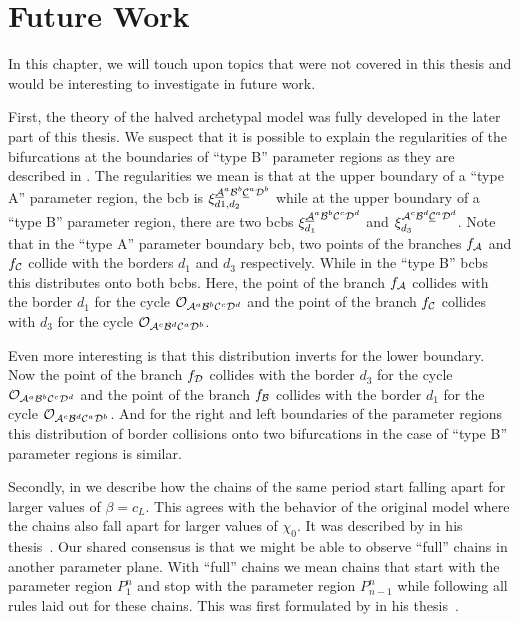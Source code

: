 \chapter{Future Work}
\label{chap:outlook}

In this chapter, we will touch upon topics that were not covered in this thesis and would be interesting to investigate in future work.

First, the theory of the halved archetypal model was fully developed in the later part of this thesis.
We suspect that it is possible to explain the regularities of the bifurcations at the boundaries of ``type B'' parameter regions as they are described in .
The regularities we mean is that at the upper boundary of a ``type A'' parameter region, the \gls{bcb} is $\xi_{d1, d_2}^{\underline{\mathcal{A}}^a\mathcal{B}^b\underline{\mathcal{C}}^a\mathcal{D}^b}$ while at the upper boundary of a ``type B'' parameter region, there are two \glspl{bcb} $\xi_{d_1}^{\underline{\mathcal{A}}^a\mathcal{B}^b\mathcal{C}^c\mathcal{D}^d}$ and $\xi_{d_3}^{\mathcal{A}^c\mathcal{B}^d\underline{\mathcal{C}}^a\mathcal{D}^d}$.
Note that in the ``type A'' parameter boundary \gls{bcb}, two points of the branches $f_{\mathcal{A}}$ and $f_{\mathcal{C}}$ collide with the borders $d_1$ and $d_3$ respectively.
While in the ``type B'' \glspl{bcb} this distributes onto both \glspl{bcb}.
Here, the point of the branch $f_{\mathcal{A}}$ collides with the border $d_1$ for the cycle $\mathcal{O}_{\mathcal{A}^a\mathcal{B}^b\mathcal{C}^c\mathcal{D}^d}$ and the point of the branch $f_{\mathcal{C}}$ collides with $d_3$ for the cycle $\mathcal{O}_{\mathcal{A}^c\mathcal{B}^d\mathcal{C}^a\mathcal{D}^b}$.

Even more interesting is that this distribution inverts for the lower boundary.
Now the point of the branch $f_{\mathcal{D}}$ collides with the border $d_3$ for the cycle $\mathcal{O}_{\mathcal{A}^a\mathcal{B}^b\mathcal{C}^c\mathcal{D}^d}$ and the point of the branch $f_{\mathcal{B}}$ collides with the border $d_1$ for the cycle $\mathcal{O}_{\mathcal{A}^c\mathcal{B}^d\mathcal{C}^a\mathcal{D}^b}$.
And for the right and left boundaries of the parameter regions this distribution of border collisions onto two bifurcations in the case of ``type B'' parameter regions is similar.

Secondly, in  we describe how the chains of the same period start falling apart for larger values of $\beta = c_L$.
This agrees with the behavior of the original model where the chains also fall apart for larger values of $\chi_0$.
It was described by  in his thesis~\cite{akyuz2022}.
Our shared consensus is that we might be able to observe ``full'' chains in another parameter plane.
With ``full'' chains we mean chains that start with the parameter region $P^{n}_{1}$ and stop with the parameter region $P^{n}_{n-1}$ while following all rules laid out for these chains.
This was first formulated by  in his thesis~\cite{akyuz2022}.

